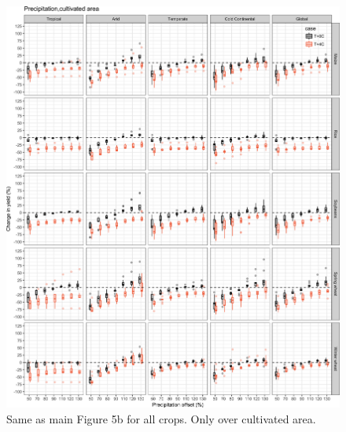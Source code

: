 \documentclass[10pt]{article}
\begin{document}
\begin{figure}[h!]
\centering
\includegraphics[width=\textwidth]{s_sim_CG_W_area.png}
\caption{Same as main Figure 5b for all crops. Only over cultivated area.}
\label{fig:water}
\end{figure}
\end{document}
